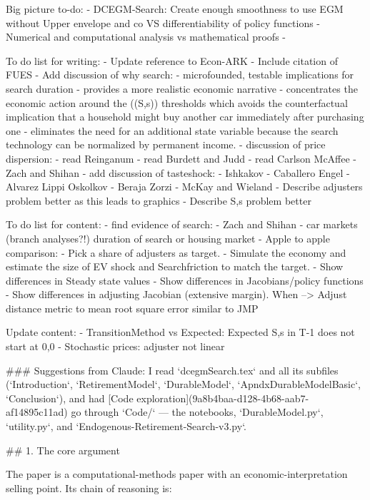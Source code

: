 Big picture to-do:
- DCEGM-Search: Create enough smoothness to use EGM without Upper envelope and co VS differentiability of policy functions
- Numerical and computational analysis vs mathematical proofs
- 

To do list for writing:
- Update reference to Econ-ARK
- Include citation of FUES
- Add discussion of why search:
    - microfounded, testable implications for search duration
    - provides a more realistic economic narrative
    - concentrates the economic action around the ((S,s)) thresholds which avoids the counterfactual implication that a household might buy another car immediately after purchasing one
    - eliminates the need for an additional state variable because the search technology can be normalized by permanent income.
- discussion of price dispersion:
    - read Reinganum
    - read Burdett and Judd
    - read Carlson McAffee
    - Zach and Shihan
- add discussion of tasteshock:
    - Ishkakov
    - Caballero Engel
    - Alvarez Lippi Oskolkov
    - Beraja Zorzi
    - McKay and Wieland
- Describe adjusters problem better as this leads to graphics
- Describe S,s problem better


To do list for content:
- find evidence of search:
    - Zach and Shihan
    - car markets (branch analyses?!) duration of search or housing market
- Apple to apple comparison:
    - Pick a share of adjusters as target.
    - Simulate the economy and estimate the size of EV shock and Searchfriction to match the target.
    - Show differences in Steady state values
    - Show differences in Jacobians/policy functions
    - Show differences in adjusting Jacobian (extensive margin). When 
    --> Adjust distance metric to mean root square error similar to JMP



Update content:
- TransitionMethod vs Expected: Expected S,s in T-1 does not start at 0,0
- Stochastic prices: adjuster not linear



### Suggestions from Claude:
I read `dcegmSearch.tex` and all its subfiles (`Introduction`, `RetirementModel`, `DurableModel`, `ApndxDurableModelBasic`, `Conclusion`), and had [Code exploration](9a8b4baa-d128-4b68-aab7-af14895c11ad) go through `Code/` — the notebooks, `DurableModel.py`, `utility.py`, and `Endogenous-Retirement-Search-v3.py`.

## 1. The core argument

The paper is a computational-methods paper with an economic-interpretation selling point. Its chain of reasoning is:

